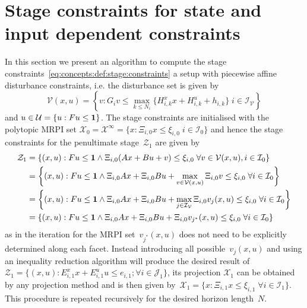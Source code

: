 \section[Stage constraints]{Stage constraints for state and input dependent constraints}\label{sec:stage:constraints:state:dependent}
%
In this section we present an algorithm to compute the stage constraints~\eqref{eq:concepts:def:stage:constraints}
a setup with piecewise affine disturbance constraints, i.e. the disturbance set is given by
%
\begin{equation}
	\mathcal V(x,u) = \left\{v: G_i v\leq \max_{k\leq N_i}\{H_{i,k}^x x + H_{i,k}^u + h_{i,k}\}\; 
	i\in\mathcal I_{\mathcal V}\right\}
\end{equation}
%
and $u\in\mathcal U=\{u:Fu\leq{\bf{1}}\}$.
%
The stage constraints are initialised with the polytopic MRPI set $\mathcal X_0=\mathcal X^\infty = 
\{x:\Xi_{i,0} x\leq\xi_{i,0}\;i\in\mathcal I_0\}$ and hence the stage constraints for the penultimate stage~$\mathcal Z_1$
are given by
%
\begin{equation*}\begin{split}
	\mathcal Z_1 &= \{(x,u): Fu\leq{\bf{1}}\wedge \Xi_{i,0}(Ax+Bu + v)\leq\xi_{i,0}\; \forall v\in\mathcal V(x,u), i\in\mathcal I_0\}\\
	&=\left\{(x,u): Fu\leq{\bf{1}}\wedge \Xi_{i,0}A x + \Xi_{i,0} Bu + \max_{v\in\mathcal V(x,u)} \Xi_{i,0}v \leq \xi_{i,0} \;\forall i\in\mathcal I_0
	\right\}\\
	&=\left\{(x,u): Fu\leq{\bf{1}}\wedge \Xi_{i,0}A x + \Xi_{i,0} Bu + \max_{j\in\mathcal I_{\mathcal V}} \Xi_{i,0}v_j(x,u) \leq \xi_{i,0} \;\forall i\in\mathcal I_0
	\right\}\\
	&=\left\{(x,u): Fu\leq{\bf{1}}\wedge \Xi_{i,0}A x + \Xi_{i,0} Bu + \Xi_{i,0}v_{j^\ast}(x,u) \leq \xi_{i,0} \;\forall i\in\mathcal I_0
	\right\}
\end{split}\end{equation*}
%
as in the iteration for the MRPI set~$v_{j^\ast}(x,u)$ does not need to be explicitly determined along each facet.
%
Instead introducing all possible~$v_j(x,u)$ and using an inequality reduction algorithm will produce the desired
result of $\mathcal Z_1 = \{(x,u): E_{i,1}^x x + E_{i,1}^u u\leq e_{i,1};\forall i\in\mathcal J_1\}$,
its projection $\mathcal X_1$ can be obtained by any projection method and is then given by~$\mathcal X_1 = \{x:\Xi_{i,1}x\leq\xi_{i,1}\;\forall i\in\mathcal I_1\}$.
This procedure is repeated recursively for the desired horizon length~$N$.
%
%
%
%
